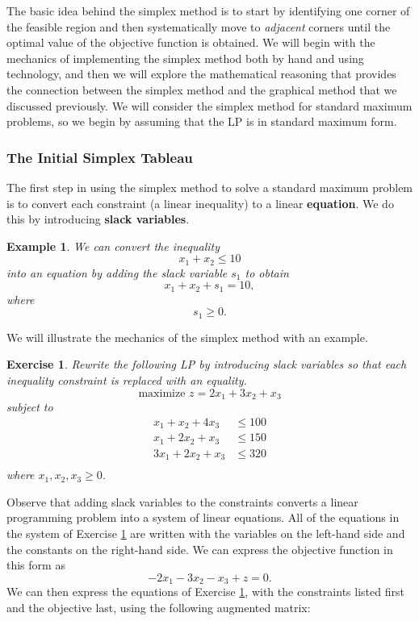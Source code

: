 \documentclass[letterpaper,10pt]{article}
\newtheorem{ex}{Exercise}
\newtheorem{exa}{Example}[section]
\begin{document}
The basic idea behind the simplex method is to start by identifying one corner of the feasible region and then systematically move to {\em adjacent} corners until the optimal value of the objective function is obtained.  We will begin with the mechanics of implementing the simplex method both by hand and using technology, and then we will explore the mathematical reasoning that provides the connection between the simplex method and the graphical method that we discussed previously.  We will consider the simplex method for standard maximum problems, so we begin by assuming that the LP is in standard maximum form.  

\subsubsection{The Initial Simplex Tableau}

The first step in using the simplex method to solve a standard maximum problem is to convert each constraint (a linear inequality) to a linear {\bf equation}.  We do this by introducing {\bf slack variables}.

\begin{exa}
We can convert the inequality $$x_1+x_2\leq 10$$ into an equation by adding the slack variable $s_1$ to obtain $$x_1+x_2+s_1=10,$$ where $$s_1\geq 0.$$
\end{exa}

We will illustrate the mechanics of the simplex method with an example.

\begin{ex}\label{Lial7-4-Ex1}
Rewrite the following LP by introducing slack variables so that each inequality constraint is replaced with an equality.
$$\text{maximize }z=2x_1+3x_2+x_3$$ subject to
\begin{eqnarray*}
x_1+x_2+4x_3&\leq 100\\
x_1+2x_2+x_3&\leq 150\\
3x_1+2x_2+x_3&\leq 320\\
\end{eqnarray*}
where $x_1,x_2,x_3\geq 0$.
\end{ex}

Observe that adding slack variables to the constraints converts a linear programming problem into a system of linear equations. All of the equations in the system of Exercise \ref{Lial7-4-Ex1} are written with the variables on the left-hand side and the constants on the right-hand side.  We can express the objective function in this form as $$-2x_1-3x_2-x_3+z=0.$$  We can then express the equations of Exercise \ref{Lial7-4-Ex1}, with the constraints listed first and the objective last, using the following augmented matrix:
\end{document}
